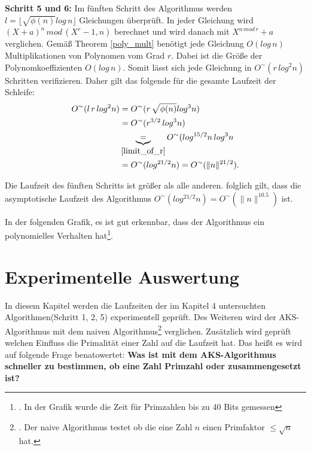 \documentclass[12pt,oneside]{article}
\theoremstyle{remark}
\theoremstyle{definition}
\begin{document}
\textbf{Schritt 5 und 6:}\newline
Im fünften Schritt des Algorithmus werden $l = \lfloor \sqrt{\phi(n)} log \, n \rfloor$ Gleichungen überprüft. In jeder Gleichung wird $(X + a)^n \, mod \, (X^r - 1,n)$ berechnet und wird danach mit $X^{n \, mod \, r} + a$ verglichen. Gemäß Theorem \ref{poly_mult} benötigt jede Gleichung $O(log \, n)$ Multiplikationen von Polynomen vom Grad $r$. Dabei ist die Größe der Polynomkoeffizienten $O(log \, n)$. Somit lässt sich jede Gleichung in $O^{\sim}(r \, log^2n)$ Schritten verifizieren. Daher gilt das folgende für die gesamte Laufzeit der Schleife:\newline
\begin{align*}
    O^{\sim}(l \, r \, log^2n) &= O^{\sim}(r \, \sqrt{\phi(n)} log^3 n)  \\
    &= O^{\sim}(r^{3/2} \, log^3 n) \\
    &\underbrace{=}_{\ref{limit_of_r}} O^{\sim}(log^{15/2}n \, log^3n \\ 
    &=O^{\sim}(log^{21/2}n) = O^{\sim}( \lVert n \rVert^{21/2}).
\end{align*}

Die Laufzeit des fünften Schritts ist größer als alle anderen. folglich gilt, dass die asymptotische Laufzeit des Algorithmus $O^{\sim}(log^{21/2}n) = O^{\sim}(\lVert n \rVert^{10.5})$ ist.\newline

In der folgenden Grafik, es ist gut erkennbar, dass der Algorithmus ein polynomielles Verhalten hat\footnote{. In der Grafik wurde die Zeit für Primzahlen bis zu 40 Bits gemessen}.


\newpage

\section{Experimentelle Auswertung}
In diesem Kapitel werden die Laufzeiten der im Kapitel 4 untersuchten Algorithmen(Schritt 1, 2, 5) experimentell geprüft. Des Weiteren wird der AKS-Algorithmus mit dem naiven Algorithmus\footnote{. Der naive Algorithmus testet ob die eine Zahl $n$ einen Primfaktor $\leq  \sqrt{n}$ hat.} verglichen. Zusätzlich wird geprüft welchen Einfluss die Primalität einer Zahl auf die Laufzeit hat. Das heißt es wird auf folgende Frage benatowertet:\newline
\textbf{Was ist mit dem AKS-Algorithmus schneller zu bestimmen, ob eine Zahl Primzahl oder zusammengesetzt ist?}
\end{document}
